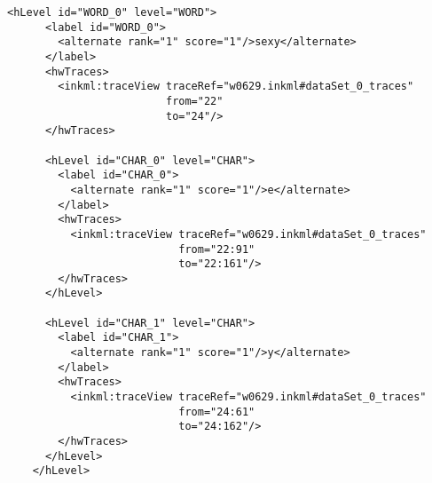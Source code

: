\begin{xmlcode}
  \begin{lstlisting}[emph={hLevel},
                     emphstyle={\color{blue}\textbf},
                     emph={[2]hwTraces},
                     emphstyle={[2]\color{green}\textbf},
                     emph={[3]id,level},
                     emphstyle={[3]\color{red}},
                     caption={Demonstration of the \emph{hLevel} tag in UPX},
                     label=lst:hLevelinupx]
    <hLevel id="WORD_0" level="WORD">
      <label id="WORD_0">
        <alternate rank="1" score="1"/>sexy</alternate>
      </label>
      <hwTraces> 
        <inkml:traceView traceRef="w0629.inkml#dataSet_0_traces" 
                         from="22" 
                         to="24"/>
      </hwTraces>

      <hLevel id="CHAR_0" level="CHAR">
        <label id="CHAR_0">
          <alternate rank="1" score="1"/>e</alternate>
        </label>
        <hwTraces> 
          <inkml:traceView traceRef="w0629.inkml#dataSet_0_traces" 
                           from="22:91" 
                           to="22:161"/>
        </hwTraces>
      </hLevel>

      <hLevel id="CHAR_1" level="CHAR">
        <label id="CHAR_1">
          <alternate rank="1" score="1"/>y</alternate>
        </label>
        <hwTraces> 
          <inkml:traceView traceRef="w0629.inkml#dataSet_0_traces" 
                           from="24:61" 
                           to="24:162"/>
        </hwTraces>
      </hLevel>
    </hLevel>
  \end{lstlisting}
\end{xmlcode}

